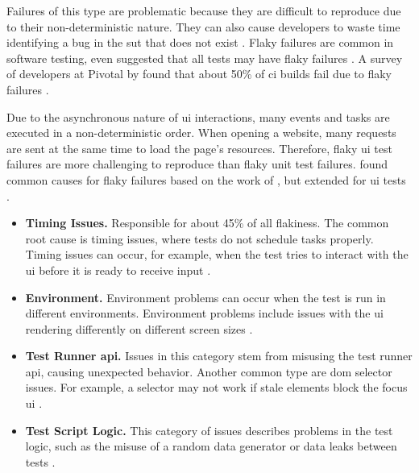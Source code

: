 Failures of this type are problematic because they are difficult to reproduce due to their non-deterministic nature.
They can also cause developers to waste time identifying a bug in the \ac{sut} that does not exist \autocite{ziftci_-flake_2020}.
Flaky failures are common in software testing, \citeauthor*{harman_start-ups_2018} even suggested that all tests may have flaky failures \autocite{harman_start-ups_2018}.
A survey of developers at Pivotal by \citeauthor*{hilton_trade-offs_2017} found that about 50\% of \ac{ci} builds fail due to flaky failures \autocite{hilton_trade-offs_2017}.

Due to the asynchronous nature of \ac{ui} interactions, many events and tasks are executed in a non-deterministic order.
When opening a website, many requests are sent at the same time to load the page's resources.
Therefore, flaky \ac{ui} test failures are more challenging to reproduce than flaky unit test failures.
 found common causes for flaky failures based on the work of \citeauthor*{luo_empirical_2014}, but extended for \ac{ui} tests \autocite{luo_empirical_2014,romano_empirical_2021}.

\begin{itemize}
	\item \textbf{Timing Issues.} Responsible for about 45\% of all flakiness. The common root cause is timing issues, where tests do not schedule tasks properly.
	      Timing issues can occur, for example, when the test tries to interact with the \ac{ui} before it is ready to receive input \autocite{romano_empirical_2021}.
	\item \textbf{Environment.} Environment problems can occur when the test is run in different environments.
	      Environment problems include issues with the \ac{ui} rendering differently on different screen sizes \autocite{romano_empirical_2021}.
	\item \textbf{Test Runner \acs{api}.} Issues in this category stem from misusing the test runner \ac{api}, causing unexpected behavior.
	      Another common type are \ac{dom} selector issues. For example, a selector may not work if stale elements block the focus \ac{ui} \autocite{romano_empirical_2021}.
	\item \textbf{Test Script Logic.} This category of issues describes problems in the test logic, such as the misuse of a random data generator or data leaks between tests \autocite{romano_empirical_2021}.
\end{itemize}


